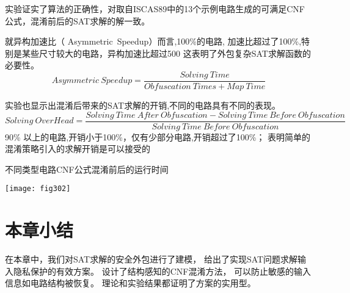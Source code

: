 实验证实了算法的正确性，对取自ISCAS89中的13个示例电路生成的可满足CNF公式，混淆前后的SAT求解的解一致。

就异构加速比（ Asymmetric~Speedup）\cite{c.WANG}而言,100\%的电路, 加速比超过了100\%,特别是某些尺寸较大的电路，异构加速比超过500%
这表明了外包复杂SAT求解函数的必要性。
\begin{equation}
Asymmetric~Speedup= \frac{Solving~Time}{Obfuscation~Times + Map~Time}
\end{equation}

实验也显示出混淆后带来的SAT求解的开销,不同的电路具有不同的表现。
\begin{equation}
Solving~OverHead=\frac{Solving~Time~After~Obfuscation-Solving~Time~Before~Obfuscation}{Solving~Time~Before~Obfuscation}
\end{equation}
90\% 以上的电路,开销小于100\%，仅有少部分电路,开销超过了100\%；
表明简单的混淆策略引入的求解开销是可以接受的

\begin{table*}
\caption{不同类型电路CNF公式混淆前后的运行时间}
\centering
\texttt{[image: fig302]}
\label{3:fig_exp}
\end{table*}%
%
\section{本章小结}
在本章中，我们对SAT求解的安全外包进行了建模，
给出了实现SAT问题求解输入隐私保护的有效方案。
设计了结构感知的CNF混淆方法，
可以防止敏感的输入信息如电路结构被恢复。
理论和实验结果都证明了方案的实用型。
